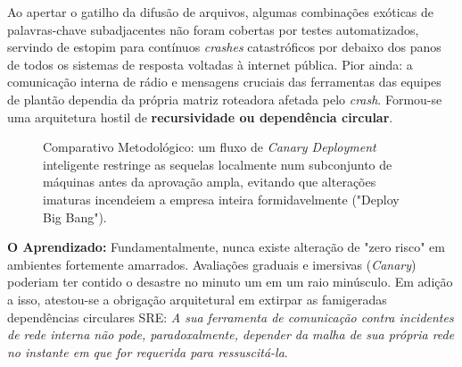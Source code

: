 \documentclass[12pt,a4paper]{report}
\begin{document}
Ao apertar o gatilho da difusão de arquivos, algumas combinações exóticas de palavras-chave subadjacentes não foram cobertas por testes automatizados, servindo de estopim para contínuos \textit{crashes} catastróficos por debaixo dos panos de todos os sistemas de resposta voltadas à internet pública. 
Pior ainda: a comunicação interna de rádio e mensagens cruciais das ferramentas das equipes de plantão dependia da própria matriz roteadora afetada pelo \textit{crash}. Formou-se uma arquitetura hostil de \textbf{recursividade ou dependência circular}.

\begin{figure}[h]
    \centering
    \caption{Comparativo Metodológico: um fluxo de \textit{Canary Deployment} inteligente restringe as sequelas localmente num subconjunto de máquinas antes da aprovação ampla, evitando que alterações imaturas incendeiem a empresa inteira formidavelmente ("Deploy Big Bang").}
\end{figure}

\textbf{O Aprendizado:} Fundamentalmente, nunca existe alteração de "zero risco" em ambientes fortemente amarrados. Avaliações graduais e imersivas (\textit{Canary}) poderiam ter contido o desastre no minuto um em um raio minúsculo. Em adição a isso, atestou-se a obrigação arquitetural em extirpar as famigeradas dependências circulares SRE: \textit{A sua ferramenta de comunicação contra incidentes de rede interna não pode, paradoxalmente, depender da malha de sua própria rede no instante em que for requerida para ressuscitá-la}.
\end{document}

